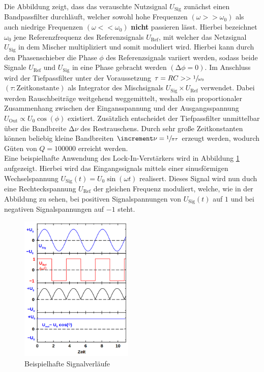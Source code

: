 \noindent Die Abbildung zeigt, dass das verauschte Nutzsignal $U_\text{Sig}$ zunächst einen Bandpassfilter durchläuft,
welcher sowohl hohe Frequenzen $\left(\omega >> \omega_0\right)$ als auch niedrige Frequenzen $\left(\omega << \omega_0\right)$
\textbf{nicht} passieren lässt. Hierbei bezeichnet $\omega_0$ jene Referenzfrequenz des Referenzsignals $U_\text{Ref}$, mit welcher 
das Netzsignal $U_\text{Sig}$ in dem Mischer multipliziert und somit moduliert wird. Hierbei kann durch den Phasenschieber die Phase  
$\phi$ des Referenzsignals variiert werden, sodass beide Signale $U_\text{Ref}$ und $U_\text{Sig}$ in eine Phase gebracht werden 
$\left(\increment \phi = 0\right)$. Im Anschluss wird der Tiefpassfilter unter der Voraussetzung $\tau = RC >> \sfrac{1}{\omega_0}$ 
$\left(\tau: \text{Zeitkonstante}\right)$ als Integrator des Mischsignals $U_\text{Sig} \times U_\text{Ref}$ verwendet. Dabei werden 
Rauschbeiträge weitgehend weggemittelt, weshalb ein proportionaler Zusammenhang zwischen der Eingansspannung und der Ausgangsspannung $U_\text{Out} \propto U_0\cos(\phi)$ 
existiert. Zusätzlich entscheidet der Tiefpassfilter unmittelbar über die Bandbreite $\increment\nu$ des
Restrauschens. Durch sehr große Zeitkonstanten können beliebig kleine Bandbreiten $\increment\nu = \sfrac{1}{\pi\tau}$ erzeugt werden,
wodurch Güten von $Q = 100000$ erreicht werden.\\
Eine beispielhafte Anwendung des Lock-In-Verstärkers wird in Abbildung \ref{fig:AWD} aufgezeigt. Hierbei wird das Eingangssignals 
mittels einer sinusförmigen Wechselspannung $U_\text{Sig}(t) = U_{0}\sin(\omega t)$ realisert. Dieses Signal wird nun duch eine
Rechteckspannung $U_\text{Ref}$ der gleichen Frequenz moduliert, welche, wie in der Abbildung zu sehen, bei positiven Signalspannungen
von $U_\text{Sig}(t)$ auf $1$ und bei negativen Signalspannungen auf $-1$ steht.

\begin{figure}
    \centering
    \includegraphics[height=7cm]{AWD.png}
    \caption{Beispielhafte Signalverläufe}
    \label{fig:AWD}
\end{figure}

